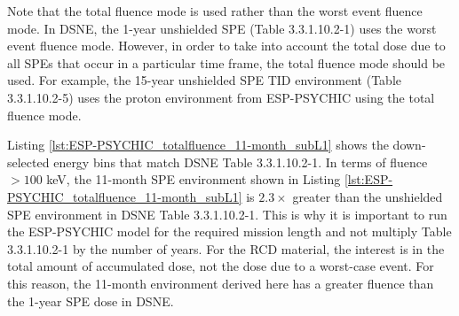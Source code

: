 \documentclass{hitec}
\begin{document}
Note that the \textsf{total fluence} mode is used rather than the \textsf{worst event fluence} mode. In DSNE, the 1-year unshielded SPE (Table 3.3.1.10.2-1) uses the \textsf{worst event fluence} mode. However, in order to take into account the total dose due to all SPEs that occur in a particular time frame, the \textsf{total fluence} mode should be used. For example, the 15-year unshielded SPE TID environment (Table 3.3.1.10.2-5) uses the proton environment from ESP-PSYCHIC using the \textsf{total fluence} mode.

Listing \ref{lst:ESP-PSYCHIC_totalfluence_11-month_subL1} shows the down-selected energy bins that match DSNE Table 3.3.1.10.2-1. In terms of fluence $> 100$ keV, the 11-month SPE environment shown in Listing \ref{lst:ESP-PSYCHIC_totalfluence_11-month_subL1} is $2.3\times$ greater than the unshielded SPE environment in DSNE Table 3.3.1.10.2-1.%
This is why it is important to run the ESP-PSYCHIC model for the required mission length and not multiply Table 3.3.1.10.2-1 by the number of years. For the RCD material, the interest is in the total amount of accumulated dose, not the dose due to a worst-case event. For this reason, the 11-month environment derived here has a greater fluence than the 1-year SPE dose in DSNE.%
\end{document}
